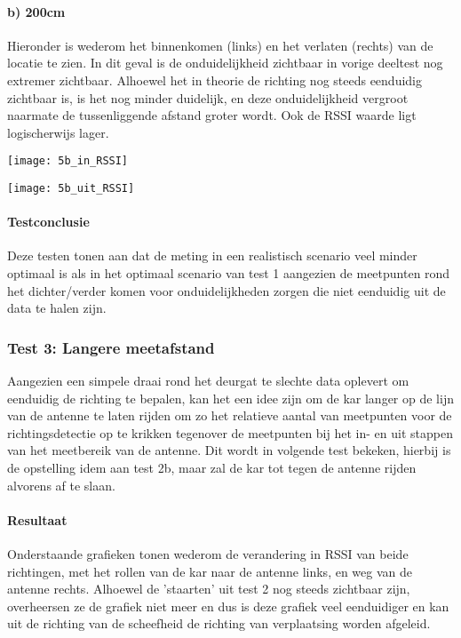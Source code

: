 \paragraph{b) 200cm}
Hieronder is wederom het binnenkomen (links) en het verlaten (rechts) van de locatie te zien. In dit geval is de onduidelijkheid zichtbaar in vorige deeltest nog extremer zichtbaar. Alhoewel het in theorie de richting nog steeds eenduidig zichtbaar is, is het nog minder duidelijk, en deze onduidelijkheid vergroot naarmate de tussenliggende afstand groter wordt. Ook de RSSI waarde ligt logischerwijs lager.

\begin{minipage}{0.42\textwidth}
	\texttt{[image: 5b\_in\_RSSI]}
	\label{fig:ond-rfid-static-5bin-res}
\end{minipage}
\hfill
\begin{minipage}{0.42\textwidth}
	\texttt{[image: 5b\_uit\_RSSI]}
	\label{fig:ond-rfid-static-5buit-res}
\end{minipage}

\paragraph{Testconclusie}
Deze testen tonen aan dat de meting in een realistisch scenario veel minder optimaal is als in het optimaal scenario van test 1 aangezien de meetpunten rond het dichter/verder komen voor onduidelijkheden zorgen die niet eenduidig uit de data te halen zijn.

\subsubsection{Test 3: Langere meetafstand}
Aangezien een simpele draai rond het deurgat te slechte data oplevert om eenduidig de richting te bepalen, kan het een idee zijn om de kar langer op de lijn van de antenne te laten rijden om zo het relatieve aantal van meetpunten voor de richtingsdetectie op te krikken tegenover de meetpunten bij het in- en uit stappen van het meetbereik van de antenne. Dit wordt in volgende test bekeken, hierbij is de opstelling idem aan test 2b, maar zal de kar tot tegen de antenne rijden alvorens af te slaan.

\paragraph{Resultaat}
Onderstaande grafieken tonen wederom de verandering in RSSI van beide richtingen, met het rollen van de kar naar de antenne links, en weg van de antenne rechts. Alhoewel de 'staarten' uit test 2 nog steeds zichtbaar zijn, overheersen ze de grafiek niet meer en dus is deze grafiek veel eenduidiger en kan uit de richting van de scheefheid de richting van verplaatsing worden afgeleid.

